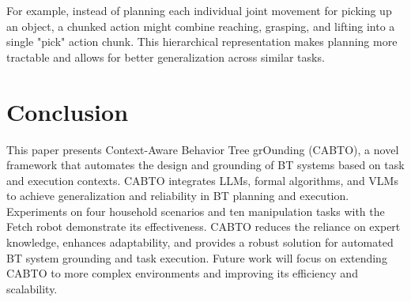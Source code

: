 \documentclass{article}
\begin{document}
For example, instead of planning each individual joint movement for picking up an object, a chunked action might combine reaching, grasping, and lifting into a single "pick" action chunk. This hierarchical representation makes planning more tractable and allows for better generalization across similar tasks.



\section{Conclusion}

This paper presents Context-Aware Behavior Tree grOunding (CABTO), a novel framework that automates the design and grounding of BT systems based on task and execution contexts. CABTO integrates LLMs, formal algorithms, and VLMs to achieve generalization and reliability in BT planning and execution. Experiments on four household scenarios and ten manipulation tasks with the Fetch robot demonstrate its effectiveness. CABTO reduces the reliance on expert knowledge, enhances adaptability, and provides a robust solution for automated BT system grounding and task execution. Future work will focus on extending CABTO to more complex environments and improving its efficiency and scalability.







\newpage




\end{document}

